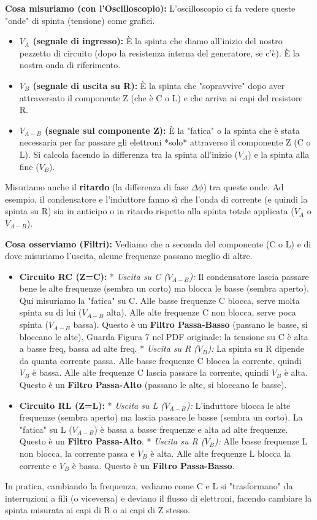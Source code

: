 \documentclass[a4paper, 11pt]{article}
\begin{document}
\textbf{Cosa misuriamo (con l'Oscilloscopio):}
L'oscilloscopio ci fa vedere queste "onde" di spinta (tensione) come grafici.
\begin{itemize}
    \item \textbf{$V_A$ (segnale di ingresso):} È la spinta che diamo all'inizio del nostro pezzetto di circuito (dopo la resistenza interna del generatore, se c'è). È la nostra onda di riferimento.
    \item \textbf{$V_B$ (segnale di uscita su R):} È la spinta che "sopravvive" dopo aver attraversato il componente Z (che è C o L) e che arriva ai capi del resistore R.
    \item \textbf{$V_{A-B}$ (segnale sul componente Z):} È la "fatica" o la spinta che è stata necessaria per far passare gli elettroni *solo* attraverso il componente Z (C o L). Si calcola facendo la differenza tra la spinta all'inizio ($V_A$) e la spinta alla fine ($V_B$).
\end{itemize}
Misuriamo anche il \textbf{ritardo} (la differenza di fase $\Delta\phi$) tra queste onde. Ad esempio, il condensatore e l'induttore fanno sì che l'onda di corrente (e quindi la spinta su R) sia in anticipo o in ritardo rispetto alla spinta totale applicata ($V_A$ o $V_{A-B}$).

\textbf{Cosa osserviamo (Filtri):}
Vediamo che a seconda del componente (C o L) e di dove misuriamo l'uscita, alcune frequenze passano meglio di altre.
\begin{itemize}
    \item \textbf{Circuito RC (Z=C):}
        *   \textit{Uscita su C ($V_{A-B}$):} Il condensatore lascia passare bene le alte frequenze (sembra un corto) ma blocca le basse (sembra aperto). Qui misuriamo la "fatica" su C. Alle basse frequenze C blocca, serve molta spinta su di lui ($V_{A-B}$ alta). Alle alte frequenze C non blocca, serve poca spinta ($V_{A-B}$ bassa). Questo è un \textbf{Filtro Passa-Basso} (passano le basse, si bloccano le alte). Guarda Figura 7 nel PDF originale: la tensione su C è alta a basse freq, bassa ad alte freq.
        *   \textit{Uscita su R ($V_B$):} La spinta su R dipende da quanta corrente passa. Alle basse frequenze C blocca la corrente, quindi $V_B$ è bassa. Alle alte frequenze C lascia passare la corrente, quindi $V_B$ è alta. Questo è un \textbf{Filtro Passa-Alto} (passano le alte, si bloccano le basse).
    \item \textbf{Circuito RL (Z=L):}
        *   \textit{Uscita su L ($V_{A-B}$):} L'induttore blocca le alte frequenze (sembra aperto) ma lascia passare le basse (sembra un corto). La "fatica" su L ($V_{A-B}$) è bassa a basse frequenze e alta ad alte frequenze. Questo è un \textbf{Filtro Passa-Alto}.
        *   \textit{Uscita su R ($V_B$):} Alle basse frequenze L non blocca, la corrente passa e $V_B$ è alta. Alle alte frequenze L blocca la corrente e $V_B$ è bassa. Questo è un \textbf{Filtro Passa-Basso}.
\end{itemize}
In pratica, cambiando la frequenza, vediamo come C e L si "trasformano" da interruzioni a fili (o viceversa) e deviano il flusso di elettroni, facendo cambiare la spinta misurata ai capi di R o ai capi di Z stesso.
\end{document}
